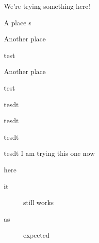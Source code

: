 		We're trying something here!
		\begin{RpgMap}[depth=0,title={A test map},prefix=Room~,blank-prefix=Cell~]
			
			\item[A place]s
			\begin{RpgMap}
				\item[Another place] 
				\item[test]
				\begin{RpgMap}
				\item[Another place] 
				\item[test]
				\item[tesdt]
				\item[tesdt]
				\item[tesdt]
			\end{RpgMap}
				\item[tesdt]
				 I am trying this one now
			\end{RpgMap}
			\item[here]
		\end{RpgMap}
		

		\begin{description}
			\item[it] still works
			\item[as] expected  
		\end{description}
